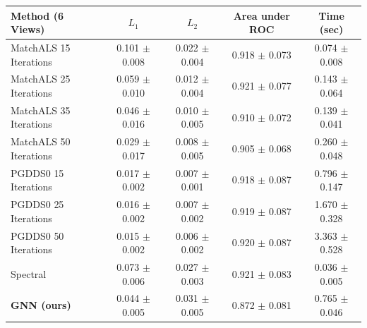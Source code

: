 \documentclass[10pt,twocolumn,letterpaper]{article}
\begin{document}
\begin{table}
\begin{center}
\begin{tabular}{|l|c|c|c|c|}
\hline
Method (6 Views)                                     & $L_1$             & $L_2$             & Area under ROC    & Time (sec)        \\
\hline\hline
MatchALS \cite{zhou2015multi} 15 Iterations          & 0.101 $\pm$ 0.008 & 0.022 $\pm$ 0.004 & 0.918 $\pm$ 0.073 & 0.074 $\pm$ 0.008 \\ \hline
MatchALS \cite{zhou2015multi} 25 Iterations          & 0.059 $\pm$ 0.010 & 0.012 $\pm$ 0.004 & 0.921 $\pm$ 0.077 & 0.143 $\pm$ 0.064 \\ \hline
MatchALS \cite{zhou2015multi} 35 Iterations          & 0.046 $\pm$ 0.016 & 0.010 $\pm$ 0.005 & 0.910 $\pm$ 0.072 & 0.139 $\pm$ 0.041 \\ \hline
MatchALS \cite{zhou2015multi} 50 Iterations          & 0.029 $\pm$ 0.017 & 0.008 $\pm$ 0.005 & 0.905 $\pm$ 0.068 & 0.260 $\pm$ 0.048 \\ \hline
PGDDS0 \cite{leonardos2016distributed} 15 Iterations & 0.017 $\pm$ 0.002 & 0.007 $\pm$ 0.001 & 0.918 $\pm$ 0.087 & 0.796 $\pm$ 0.147 \\ \hline
PGDDS0 \cite{leonardos2016distributed} 25 Iterations & 0.016 $\pm$ 0.002 & 0.007 $\pm$ 0.002 & 0.919 $\pm$ 0.087 & 1.670 $\pm$ 0.328 \\ \hline
PGDDS0 \cite{leonardos2016distributed} 50 Iterations & 0.015 $\pm$ 0.002 & 0.006 $\pm$ 0.002 & 0.920 $\pm$ 0.087 & 3.363 $\pm$ 0.528 \\ \hline
Spectral \cite{pachauri2013solving}                  & 0.073 $\pm$ 0.006 & 0.027 $\pm$ 0.003 & 0.921 $\pm$ 0.083 & 0.036 $\pm$ 0.005 \\ \hline
\textbf{GNN (ours)}                                  & 0.044 $\pm$ 0.005 & 0.031 $\pm$ 0.005 & 0.872 $\pm$ 0.081 & 0.765 $\pm$ 0.046 \\ \hline


\end{tabular}
\end{center}
\end{table}
\end{document}

